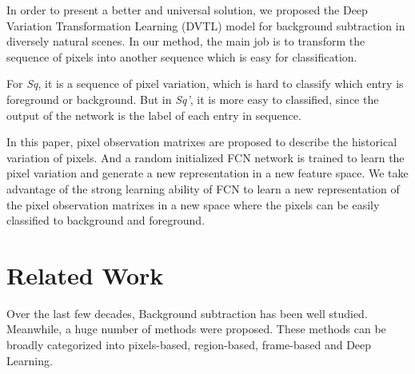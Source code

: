 \documentclass[runningheads,a4paper]{llncs}
\begin{document}
	In order to present a better and universal solution, we proposed the Deep Variation Transformation Learning (DVTL) model for background subtraction in diversely natural scenes. In our method, the main job is to transform the sequence of pixels into another sequence which is easy for classification.

	For \emph{Sq}, it is a sequence of pixel variation, which is hard to classify which entry is foreground or background. But in \emph{Sq'}, it is more easy to classified, since the output of the network is the label of each entry in sequence.

	In this paper, pixel observation matrixes are proposed to describe the historical variation of pixels. And a random initialized FCN network is trained to learn the pixel variation and generate a new representation in a new feature space. We take advantage of the strong learning ability of FCN to learn a new representation of the pixel observation matrixes in a new space where the pixels can be easily classified to background and foreground.




\section{Related Work}
Over the last few decades, Background subtraction has been well studied. Meanwhile, a huge number of methods were proposed. These methods can be broadly categorized into pixels-based, region-based, frame-based and Deep Learning.
\end{document}
